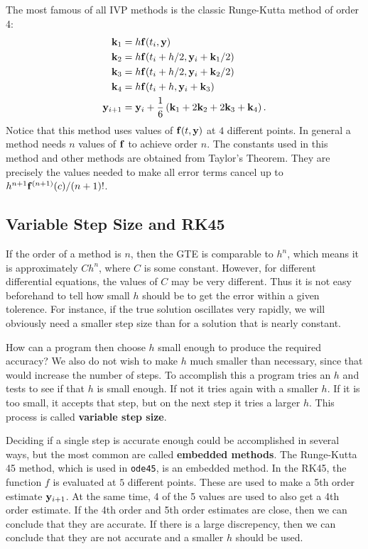 The most famous of all IVP methods is the classic Runge-Kutta method
of order 4:
\begin{equation}
\begin{split}
\mathbf{k}_1 &= h \mathbf{f}(t_i,\mathbf{y})\\
\mathbf{k}_2 &= h \mathbf{f}(t_i+h/2, \mathbf{y}_i + \mathbf{k}_1/2)\\
\mathbf{k}_3 &= h \mathbf{f}(t_i+h/2, \mathbf{y}_i + \mathbf{k}_2/2)\\
\mathbf{k}_4 &= h \mathbf{f}(t_i+h, \mathbf{y}_i + \mathbf{k}_3)\\
\mathbf{y}_{i+1} &= \mathbf{y}_i + \frac{1}{6} \left(\mathbf{k}_1 + 2 \mathbf{k}_2
                    + 2 \mathbf{k}_3 + \mathbf{k}_4\right).
\end{split}
\end{equation}
Notice that this method uses values of $\mathbf{f}(t,\mathbf{y})$ at $4$ different points.
In general a method needs $n$ values of $\mathbf{f}$ to achieve order $n$.
The constants used in this method and other methods are obtained
from Taylor's Theorem. They are precisely the values needed to make
all error terms cancel up to $h^{n+1}\mathbf{f}^{(n+1)}(c)/(n+1)!$.


\subsection*{Variable Step Size and RK45}

If the order of a method is $n$, then the GTE is
comparable to $h^n$, which means it is approximately $C h^n$,
where $C$ is some constant. However, for different differential
equations, the values of $C$ may be very different. Thus it is
not easy beforehand to tell how small $h$ should be to get
the error within a given tolerence. For instance, if the true
solution oscillates very rapidly, we will obviously need
a smaller step size than for a solution that is nearly constant.

How can a program then choose $h$ small enough to produce
the required accuracy? We also do not wish to make $h$
much smaller than necessary, since that would increase
the number of steps. To accomplish this a program tries
an $h$ and tests to see if that $h$ is small enough.
If not it tries again with a smaller $h$. If it is too
small, it accepts that step, but on the next step it
tries a larger $h$. This process is called {\bf variable step
size}.

Deciding if a single step is accurate enough could be accomplished in
several ways, but the most common are called {\bf embedded methods}.
The Runge-Kutta 45 method, which is used in \verb&ode45&, is an embedded
method. In the RK45, the function
$f$ is evaluated at $5$ different points. These are used to make
a 5th order estimate $\mathbf{y}_{i+1}$. At the same time, 4 of the 5 values
are used to also get a 4th order estimate. If the 4th order and 5th order
estimates are close, then we can conclude that they are accurate. If
there is a large discrepency, then we can conclude that they are not
accurate and a smaller $h$ should be used.

